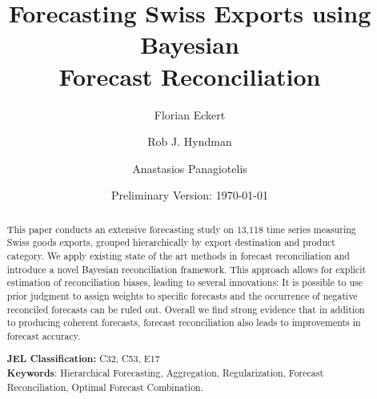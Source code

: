 


\title{\huge Forecasting Swiss Exports using Bayesian \\Forecast Reconciliation}

\author[$\dagger$]{Florian Eckert}
\author[$\ddagger$]{Rob J. Hyndman}
\author[$\ddagger$]{Anastasios Panagiotelis}
\date{Preliminary Version: \today}

\maketitle
\begin{abstract}
\noindent This paper conducts an extensive forecasting study on 13,118 time series measuring Swiss goods exports, grouped hierarchically by export destination and product category.  We apply existing state of the art methods in forecast reconciliation and introduce a novel Bayesian reconciliation framework. This approach allows for explicit estimation of reconciliation biases, leading to several innovations: It is possible to use prior judgment to assign weights to specific forecasts and the occurrence of negative reconciled forecasts can be ruled out. Overall we find strong evidence that in addition to producing coherent forecasts, forecast reconciliation also leads to improvements in forecast accuracy.

\noindent \textbf{JEL Classification:} C32, C53, E17\\
\noindent \textbf{Keywords}: Hierarchical Forecasting, Aggregation, Regularization, Forecast Reconciliation, Optimal Forecast Combination.
\end{abstract}
\clearpage









